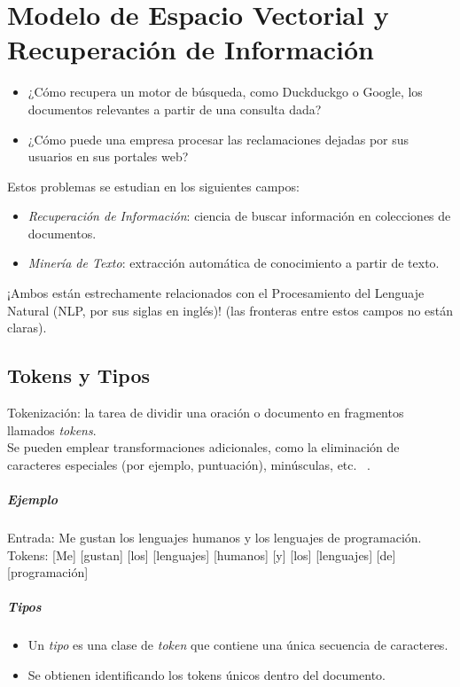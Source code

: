 \documentclass{book}
\begin{document}
\chapter{Modelo de Espacio Vectorial y Recuperación de Información}

\begin{itemize}
   \item ¿Cómo recupera un motor de búsqueda, como Duckduckgo o Google, los documentos relevantes a partir de una consulta dada?
   \item ¿Cómo puede una empresa procesar las reclamaciones dejadas por sus usuarios en sus portales web?
\end{itemize}

Estos problemas se estudian en los siguientes campos:

\begin{itemize}
   \item \emph{Recuperación de Información}: ciencia de buscar información en colecciones de documentos.
   \item \emph{Minería de Texto}: extracción automática de conocimiento a partir de texto.
\end{itemize}

¡Ambos están estrechamente relacionados con el Procesamiento del Lenguaje Natural (NLP, por sus siglas en inglés)! (las fronteras entre estos campos no están claras).

\section{Tokens y Tipos}

Tokenización: la tarea de dividir una oración o documento en fragmentos llamados \emph{tokens}. \\
Se pueden emplear transformaciones adicionales, como la eliminación de caracteres especiales (por ejemplo, puntuación), minúsculas, etc. ~\cite{manning2008}.

\paragraph{Ejemplo}
Entrada: Me gustan los lenguajes humanos y los lenguajes de programación.\\
Tokens: [Me] [gustan] [los] [lenguajes] [humanos] [y] [los] [lenguajes] [de] [programación]


\paragraph{Tipos}
\begin{itemize}
\item Un \emph{tipo} es una clase de \emph{token} que contiene una única secuencia de caracteres.
\item Se obtienen identificando los tokens únicos dentro del documento.
\end{itemize}
\end{document}
